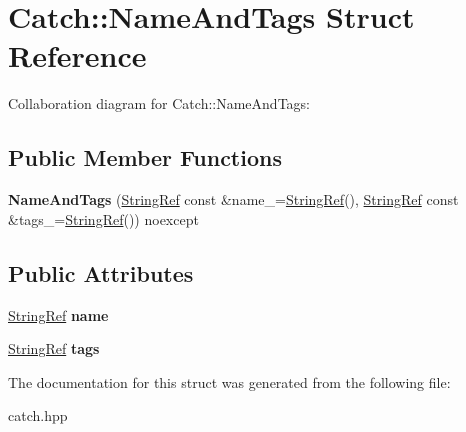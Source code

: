 \hypertarget{structCatch_1_1NameAndTags}{}\section{Catch\+:\+:Name\+And\+Tags Struct Reference}
\label{structCatch_1_1NameAndTags}


Collaboration diagram for Catch\+:\+:Name\+And\+Tags\+:
\subsection*{Public Member Functions}
\begin{DoxyCompactItemize}
\item 
{\bfseries Name\+And\+Tags} (\hyperlink{classCatch_1_1StringRef}{String\+Ref} const \&name\+\_\+=\hyperlink{classCatch_1_1StringRef}{String\+Ref}(), \hyperlink{classCatch_1_1StringRef}{String\+Ref} const \&tags\+\_\+=\hyperlink{classCatch_1_1StringRef}{String\+Ref}()) noexcept\hypertarget{structCatch_1_1NameAndTags_ab585111e615ce8c504a2b9630de8ee94}{}\label{structCatch_1_1NameAndTags_ab585111e615ce8c504a2b9630de8ee94}

\end{DoxyCompactItemize}
\subsection*{Public Attributes}
\begin{DoxyCompactItemize}
\item 
\hyperlink{classCatch_1_1StringRef}{String\+Ref} {\bfseries name}\hypertarget{structCatch_1_1NameAndTags_a7cbea60e0cebfa622c667008eb011420}{}\label{structCatch_1_1NameAndTags_a7cbea60e0cebfa622c667008eb011420}

\item 
\hyperlink{classCatch_1_1StringRef}{String\+Ref} {\bfseries tags}\hypertarget{structCatch_1_1NameAndTags_a74062ed1138834a348424eb7ed900c57}{}\label{structCatch_1_1NameAndTags_a74062ed1138834a348424eb7ed900c57}

\end{DoxyCompactItemize}


The documentation for this struct was generated from the following file\+:\begin{DoxyCompactItemize}
\item 
catch.\+hpp\end{DoxyCompactItemize}
